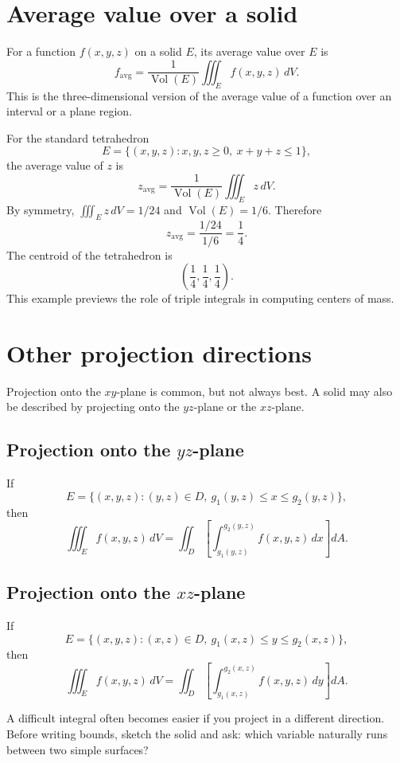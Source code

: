 \documentclass[11pt]{article}
\newcommand{\Vol}{\operatorname{Vol}}
\newcommand{\avg}{\operatorname{avg}}
\newcounter{examplecounter}
\newenvironment{workedexample}[1]{%
  \refstepcounter{examplecounter}%
  \begin{tcolorbox}[enhanced,breakable,colback=white,colframe=chapterblue,colbacktitle=chapterblue,
  title={Example 16.\theexamplecounter: #1},fonttitle=\bfseries,boxrule=0.8pt,arc=1.5mm]
}{\end{tcolorbox}}
\begin{document}
\section{Average value over a solid}

For a function $f(x,y,z)$ on a solid $E$, its average value over $E$ is
\[
f_{\avg}=\frac{1}{\Vol(E)}\iiint_E f(x,y,z)\,dV.
\]
This is the three-dimensional version of the average value of a function over an interval or a plane region.

\begin{workedexample}{Average height in a tetrahedron}
For the standard tetrahedron
\[
E=\{(x,y,z):x,y,z\ge0,\ x+y+z\le1\},
\]
the average value of $z$ is
\[
z_{\avg}=\frac{1}{\Vol(E)}\iiint_E z\,dV.
\]
By symmetry, $\iiint_E z\,dV=1/24$ and $\Vol(E)=1/6$. Therefore
\[
z_{\avg}=\frac{1/24}{1/6}=\frac14.
\]
The centroid of the tetrahedron is
\[
\left(\frac14,\frac14,\frac14\right).
\]
This example previews the role of triple integrals in computing centers of mass.
\end{workedexample}

\section{Other projection directions}

Projection onto the $xy$-plane is common, but not always best. A solid may also be described by projecting onto the $yz$-plane or the $xz$-plane.

\subsection*{Projection onto the $yz$-plane}
If
\[
E=\{(x,y,z):(y,z)\in D,\ g_1(y,z)\le x\le g_2(y,z)\},
\]
then
\[
\iiint_E f(x,y,z)\,dV
=\iint_D\left[\int_{g_1(y,z)}^{g_2(y,z)} f(x,y,z)\,dx\right]dA.
\]

\subsection*{Projection onto the $xz$-plane}
If
\[
E=\{(x,y,z):(x,z)\in D,\ g_1(x,z)\le y\le g_2(x,z)\},
\]
then
\[
\iiint_E f(x,y,z)\,dV
=\iint_D\left[\int_{g_1(x,z)}^{g_2(x,z)} f(x,y,z)\,dy\right]dA.
\]

\begin{warningbox}
A difficult integral often becomes easier if you project in a different direction. Before writing bounds, sketch the solid and ask: which variable naturally runs between two simple surfaces?
\end{warningbox}
\end{document}
